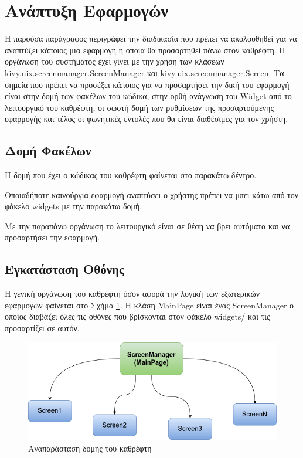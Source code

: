 \section{Ανάπτυξη Εφαρμογών}
\label{sec:development}

Η παρούσα παράγραφος περιγράφει την διαδικασία που πρέπει να ακολουθηθεί για να αναπτύξει κάποιος μια εφαρμογή η οποία θα προσαρτηθεί πάνω στον καθρέφτη. Η οργάνωση του συστήματος έχει γίνει με την χρήση των κλάσεων kivy.uix.screenmanager.ScreenManager και kivy.uix.screenmanager.Screen. Τα σημεία που πρέπει να προσέξει κάποιος για να προσαρτήσει την δική του εφαρμογή είναι στην δομή των φακέλων του κώδικα, στην ορθή ανάγνωση του Widget από το λειτουργικό του καθρέφτη, οι σωστή δομή των ρυθμίσεων της προσαρτούμενης εφαρμογής και τέλος οι φωνητικές εντολές που θα είναι διαθέσιμες για τον χρήστη.

\subsection{Δομή Φακέλων}
Η δομή που έχει ο κώδικας του καθρέφτη φαίνεται στο παρακάτω δέντρο.
\\


Οποιαδήποτε καινούργια εφαρμογή αναπτύσει ο χρήστης πρέπει να μπει κάτω από τον φάκελο widgets με την παρακάτω δομή. \\


Με την παραπάνω οργάνωση το λειτουργικό είναι σε θέση να βρει αυτόματα και να προσαρτήσει την εφαρμογή.

\subsection{Εγκατάσταση Οθόνης}
Η γενική οργάνωση του καθρέφτη όσον αφορά την λογική των εξωτερικών εφαρμογών φαίνεται στο Σχήμα \ref{fig:widget_organization}. Η κλάση MainPage είναι ένας ScreenManager ο οποίος διαβάζει όλες τις οθόνες που βρίσκονται στον φάκελο widgets/ και τις προσαρτίζει σε αυτόν.

\begin{figure}[h]
	\centering
	\includegraphics[scale=0.7]{images/chapter6/widget_organization.png}
	\caption{Αναπαράσταση δομής του καθρέφτη}
	\label{fig:widget_organization}
\end{figure}

